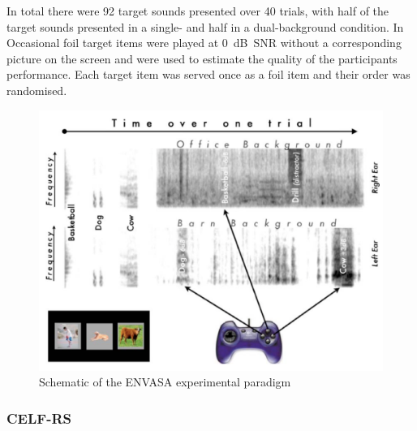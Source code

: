 \documentclass[a4paper, twoside]{templates/ociamthesis}
\begin{document}
In total there were 92 target sounds presented over 40 trials, with half of the target sounds presented in a single- and half in a dual-background condition. In Occasional foil target items were played at 0~dB~SNR without a corresponding picture on the screen and were used to estimate the quality of the participants performance. Each target item was served once as a foil item and their order was randomised.



\begin{figure}

{\centering \includegraphics[width=0.65\linewidth]{figures/ENVASAparadigm} 

}

\caption{Schematic of the ENVASA experimental paradigm \autocite[taken from][]{Leech2009}}\label{fig:ENVASA}
\end{figure}

\hypertarget{celf-rs}{%
\subsubsection{CELF-RS}\label{celf-rs}}
\end{document}
